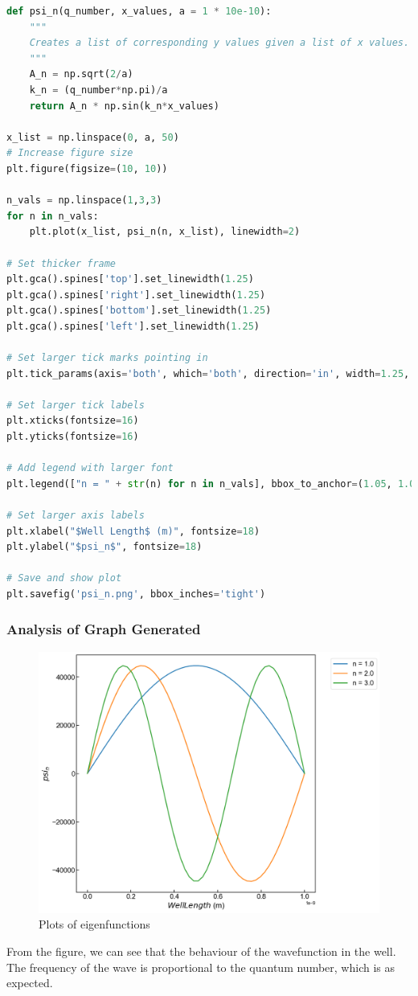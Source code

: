 \documentclass[a4paper,12pt]{article}
\begin{document}
\begin{lstlisting}[language=Python, caption= Code used to plot findings]
def psi_n(q_number, x_values, a = 1 * 10e-10):
    """
    Creates a list of corresponding y values given a list of x values.
    """
    A_n = np.sqrt(2/a)
    k_n = (q_number*np.pi)/a
    return A_n * np.sin(k_n*x_values)

x_list = np.linspace(0, a, 50)
# Increase figure size
plt.figure(figsize=(10, 10))

n_vals = np.linspace(1,3,3)
for n in n_vals:
    plt.plot(x_list, psi_n(n, x_list), linewidth=2)

# Set thicker frame
plt.gca().spines['top'].set_linewidth(1.25)
plt.gca().spines['right'].set_linewidth(1.25)
plt.gca().spines['bottom'].set_linewidth(1.25)
plt.gca().spines['left'].set_linewidth(1.25)

# Set larger tick marks pointing in
plt.tick_params(axis='both', which='both', direction='in', width=1.25, size = 6)

# Set larger tick labels
plt.xticks(fontsize=16)
plt.yticks(fontsize=16)

# Add legend with larger font
plt.legend(["n = " + str(n) for n in n_vals], bbox_to_anchor=(1.05, 1.0), loc='upper left', fontsize=16)

# Set larger axis labels
plt.xlabel("$Well Length$ (m)", fontsize=18)
plt.ylabel("$psi_n$", fontsize=18)

# Save and show plot
plt.savefig('psi_n.png', bbox_inches='tight')
\end{lstlisting}

\subsubsection{Analysis of Graph Generated}
\begin{figure}[H]
\includegraphics[width=\columnwidth]{report/figures/psi_n.png}
\caption{Plots of eigenfunctions}
\end{figure}
From the figure, we can see that the behaviour of the wavefunction in the well. The frequency of the wave is proportional to the quantum number, which is as expected. 
\end{document}
